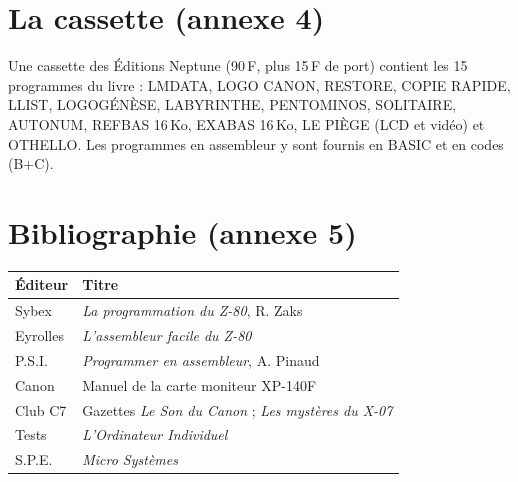 \documentclass[a4paper,10pt]{article}
\begin{document}
\section{La cassette (annexe 4)}
Une cassette des Éditions Neptune (90\,F, plus 15\,F de port) contient les
15 programmes du livre : LMDATA, LOGO CANON, RESTORE, COPIE RAPIDE, LLIST,
LOGOGÉNÈSE, LABYRINTHE, PENTOMINOS, SOLITAIRE, AUTONUM, REFBAS 16\,Ko,
EXABAS 16\,Ko, LE PIÈGE (LCD et vidéo) et OTHELLO. Les programmes en
assembleur y sont fournis en BASIC et en codes (B+C).

\section{Bibliographie (annexe 5)}
\begin{center}\small
\begin{tabular}{@{}ll@{}}
\toprule
Éditeur & Titre \\
\midrule
Sybex & \emph{La programmation du Z-80}, R. Zaks \\
Eyrolles & \emph{L'assembleur facile du Z-80} \\
P.S.I. & \emph{Programmer en assembleur}, A. Pinaud \\
Canon & Manuel de la carte moniteur XP-140F \\
Club C7 & Gazettes \emph{Le Son du Canon} ; \emph{Les mystères du X-07} \\
Tests & \emph{L'Ordinateur Individuel} \\
S.P.E. & \emph{Micro Systèmes} \\
\bottomrule
\end{tabular}
\end{center}
\end{document}

